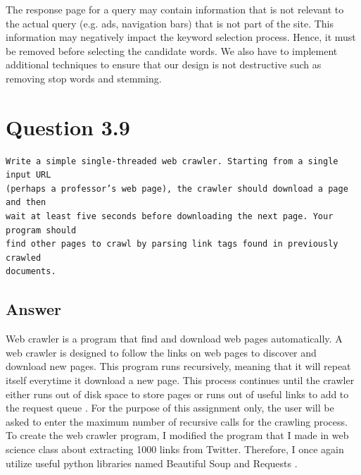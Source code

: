 \documentclass[letterpaper,11pt]{article}
\begin{document}
The response page for a query may contain information that is not relevant to the actual query (e.g. ads, navigation bars) that is not part of the site. This information may negatively impact the keyword selection process. Hence, it must be removed before selecting the candidate words. We also have to implement additional techniques to ensure that our design is not destructive such as removing stop words and stemming. 


\noindent\makebox[\linewidth]{\rule{\textwidth}{0.4pt}}

\section*{Question 3.9}
\begin{verbatim}
Write a simple single-threaded web crawler. Starting from a single input URL
(perhaps a professor’s web page), the crawler should download a page and then
wait at least five seconds before downloading the next page. Your program should
find other pages to crawl by parsing link tags found in previously crawled
documents.
\end{verbatim}

\subsection*{Answer}
Web crawler is a program that find and download web pages automatically. A web crawler is designed to follow the links on web pages to discover and download new pages. This program runs recursively, meaning that it will repeat itself everytime it download a new page. This process continues until the crawler either runs out of disk space to store pages or runs out of useful links to add to the request queue  \cite{Croft:2009:SEI:1516224}. For the purpose of this assignment only, the user will be asked to enter the maximum number of recursive calls for the crawling process. 
To create the web crawler program, I modified the program that I made in web science class about extracting 1000 links from Twitter. Therefore, I once again utilize useful python libraries named Beautiful Soup \cite{bs4} and Requests \cite{requests}. 
\end{document}
